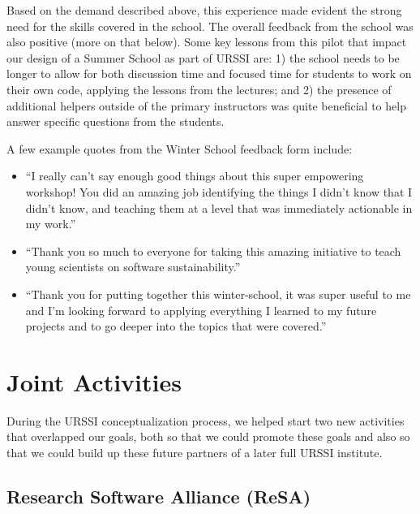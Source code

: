 \documentclass[
]{book}
\begin{document}
Based on the demand described above, this experience made evident the strong
need for the skills covered in the school. The overall feedback from the
school was also positive (more on that below). Some key lessons from this
pilot that impact our design of a Summer School as part of URSSI are: 1) the
school needs to be longer to allow for both discussion time and focused time
for students to work on their own code, applying the lessons from the lectures;
and 2) the presence of additional helpers outside of the primary instructors was
quite beneficial to help answer specific questions from the students.

A few example quotes from the Winter School feedback form include:

\begin{itemize}
\item
  ``I really can't say enough good things about this super empowering workshop!
  You did an amazing job identifying the things I didn't know that I didn't know,
  and teaching them at a level that was immediately actionable in my work.''
\item
  ``Thank you so much to everyone for taking this amazing initiative to teach young
  scientists on software sustainability.''
\item
  ``Thank you for putting together this winter-school, it was super useful to me
  and I'm looking forward to applying everything I learned to my future projects
  and to go deeper into the topics that were covered.''
\end{itemize}

\hypertarget{joint-activities}{%
\section{Joint Activities}\label{joint-activities}}

During the URSSI conceptualization process, we helped start two new activities that
overlapped our goals, both so that we could promote these goals and also so
that we could build up these future partners of a later full URSSI institute.

\hypertarget{research-software-alliance-resa}{%
\subsection{Research Software Alliance (ReSA)}\label{research-software-alliance-resa}}
\end{document}

